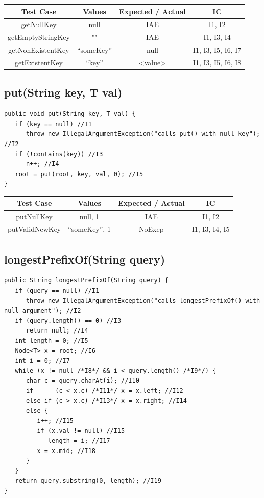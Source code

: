 \documentclass[12pt]{article}
\begin{document}
\begin{table}[htb]
\centering
\begin{tabular}{| c | c | c | c |} 
 \hline
 Test Case & Values & Expected / Actual & IC\\ \hline
 getNullKey & null & IAE & I1, I2 \\ \hline
 getEmptyStringKey & "" & IAE & I1, I3, I4 \\ \hline
 getNonExistentKey & “someKey” & null & I1, I3, I5, I6, I7 \\ \hline
 getExistentKey & “key” & <value> & I1, I3, I5, I6, I8 \\ \hline 
\end{tabular}
\end{table}

\subsection{put(String key, T val)}
\begin{lstlisting}
public void put(String key, T val) {
   if (key == null) //I1
      throw new IllegalArgumentException("calls put() with null key"); //I2
   if (!contains(key)) //I3
      n++; //I4
   root = put(root, key, val, 0); //I5
}
\end{lstlisting}

\begin{table}[htb]
\centering
\begin{tabular}{| c | c | c | c |} 
 \hline
 Test Case & Values & Expected / Actual & IC\\ \hline
 putNullKey & null, 1 & IAE & I1, I2 \\ \hline
 putValidNewKey & “someKey”, 1 & NoExep & I1, I3, I4, I5 \\ \hline
\end{tabular}
\end{table}


\subsection{longestPrefixOf(String query)}
\begin{lstlisting}
public String longestPrefixOf(String query) {
   if (query == null) //I1
      throw new IllegalArgumentException("calls longestPrefixOf() with null argument"); //I2
   if (query.length() == 0) //I3
      return null; //I4
   int length = 0; //I5
   Node<T> x = root; //I6
   int i = 0; //I7
   while (x != null /*I8*/ && i < query.length() /*I9*/) {
      char c = query.charAt(i); //I10
      if      (c < x.c) /*I11*/ x = x.left; //I12
      else if (c > x.c) /*I13*/ x = x.right; //I14
      else {
         i++; //I15
         if (x.val != null) //I15
            length = i; //I17
         x = x.mid; //I18
      }
   }
   return query.substring(0, length); //I19
}
\end{lstlisting}
\end{document}
